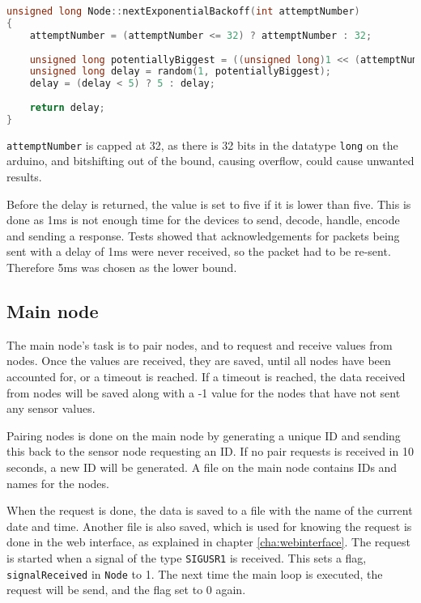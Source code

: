 \begin{lstlisting}[language=C,caption={Exponential backoff on the sensor nodes. In Node.cpp.},label={lst:expbackoff}]
unsigned long Node::nextExponentialBackoff(int attemptNumber)
{
    attemptNumber = (attemptNumber <= 32) ? attemptNumber : 32;
    
    unsigned long potentiallyBiggest = ((unsigned long)1 << (attemptNumber - 1));
    unsigned long delay = random(1, potentiallyBiggest);
    delay = (delay < 5) ? 5 : delay;
    
    return delay;
}
\end{lstlisting}
\texttt{attemptNumber} is capped at 32, as there is 32 bits in the datatype \texttt{long} on the arduino, and bitshifting out of the bound, causing overflow, could cause unwanted results.

Before the delay is returned, the value is set to five if it is lower than five. This is done as 1ms is not enough time for the devices to send, decode, handle, encode and sending a response. Tests showed that acknowledgements for packets being sent with a delay of 1ms were never received, so the packet had to be re-sent. Therefore 5ms was chosen as the lower bound.

\subsection{Main node} \label{cha:signalhandling}
The main node's task is to pair nodes, and to request and receive values from nodes. Once the values are received, they are saved, until all nodes have been accounted for, or a timeout is reached. If a timeout is reached, the data received from nodes will be saved along with a -1 value for the nodes that have not sent any sensor values.

Pairing nodes is done on the main node by generating a unique ID and sending this back to the sensor node requesting an ID. If no pair requests is received in 10 seconds, a new ID will be generated. A file on the main node contains IDs and names for the nodes.

When the request is done, the data is saved to a file with the name of the current date and time. Another file is also saved, which is used for knowing the request is done in the web interface, as explained in chapter \ref{cha:webinterface}. The request is started when a signal of the type \texttt{SIGUSR1} is received. This sets a flag, \texttt{signalReceived} in \texttt{Node} to 1. The next time the main loop is executed, the request will be send, and the flag set to 0 again.

